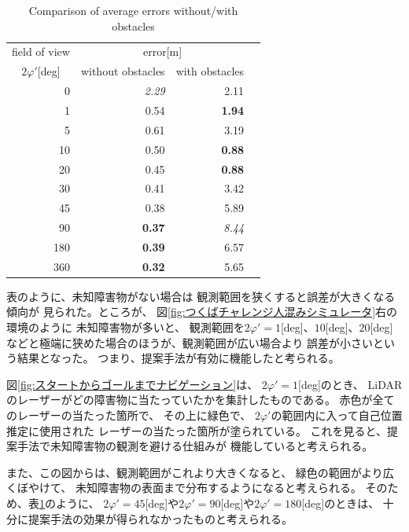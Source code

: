 \documentclass{jarticle}
\begin{document}
\begin{table}[htbp]
	\centering
	\caption{Comparison of average errors without/with obstacles}
  \label{table:error}
	\begin{small}
  \begin{tabular}{|r|r|r|r|} \hline
	  field of view & \multicolumn{2}{c|}{error[m]} \\
	  \multicolumn{1}{|c|}{$2\varphi'$[deg]}  & without obstacles & with obstacles \\ \hline \hline
	  {0}         & \textit{2.29} & 2.11 \\ \hline
	  {1}         & 0.54 &  \textbf{1.94} \\ \hline
	  {5}         & 0.61 & 3.19 \\ \hline
	  {10}        & 0.50 & \textbf{0.88} \\ \hline
	  {20}        & 0.45 & \textbf{0.88} \\ \hline
	  {30}        & 0.41 & 3.42 \\ \hline
	  {45}        & 0.38 & 5.89 \\ \hline
	  {90}        & \textbf{0.37} & \textit{8.44}\\ \hline
	  {180}        & \textbf{0.39} & 6.57\\ \hline
	  {360}       & \textbf{0.32} & 5.65 \\ \hline
  \end{tabular}
	\end{small}
\end{table}


表のように、未知障害物がない場合は
観測範囲を狭くすると誤差が大きくなる傾向が
見られた。ところが、
図\ref{fig:つくばチャレンジ人混みシミュレータ}右の環境のように
未知障害物が多いと、
観測範囲を$2\varphi'=1$[deg]、$10$[deg]、$20$[deg]
などと極端に狭めた場合のほうが、観測範囲が広い場合より
誤差が小さいという結果となった。
つまり、提案手法が有効に機能したと考られる。


図\ref{fig:スタートからゴールまでナビゲーション}は、
$2\varphi'=1$[deg]のとき、
LiDARのレーザーがどの障害物に当たっていたかを集計したものである。
赤色が全てのレーザーの当たった箇所で、
その上に緑色で、
$2\varphi'$の範囲内に入って自己位置推定に使用された
レーザーの当たった箇所が塗られている。
これを見ると、提案手法で未知障害物の観測を避ける仕組みが
機能していると考えられる。

また、この図からは、観測範囲がこれより大きくなると、
緑色の範囲がより広くぼやけて、
未知障害物の表面まで分布するようになると考えられる。
そのため、表\ref{table:error}のように、
$2\varphi'=45$[deg]や$2\varphi'=90$[deg]や$2\varphi'=180$[deg]のときは、
十分に提案手法の効果が得られなかったものと考えられる。
\end{document}
